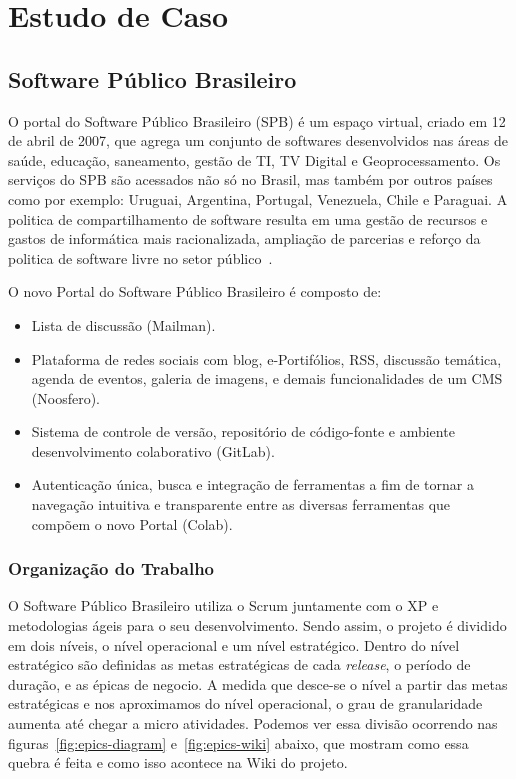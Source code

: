 \chapter{Estudo de Caso}
\label{est}
\section{Software Público Brasileiro}
\label{est:sof}

O portal do Software Público Brasileiro (SPB) é um espaço virtual, criado em 12 de 
abril de 2007, que agrega um conjunto de softwares desenvolvidos nas áreas de saúde, 
educação, saneamento, gestão de TI, TV Digital e Geoprocessamento. Os serviços do
SPB são acessados não só no Brasil, mas também por outros países como por exemplo:
Uruguai, Argentina, Portugal, Venezuela, Chile e Paraguai. A politica de compartilhamento
de software resulta em uma gestão de recursos e gastos de informática mais racionalizada,
ampliação de parcerias e reforço da politica de software livre no setor público~\cite{spb}.

O novo Portal do Software Público Brasileiro é composto de:

\begin{itemize}
    \item Lista de discussão (Mailman).
    \item Plataforma de redes sociais com blog, e-Portifólios, RSS, discussão 
    temática, agenda de eventos, galeria de imagens, e demais funcionalidades de um CMS (Noosfero).
    \item Sistema de controle de versão, repositório de código-fonte e ambiente 
    desenvolvimento colaborativo (GitLab).
    \item Autenticação única, busca e integração de ferramentas a fim de tornar 
    a navegação intuitiva e transparente entre as diversas ferramentas que compõem 
    o novo Portal (Colab).
\end{itemize}

\subsection{Organização do Trabalho}
\label{est:sof:org}

O Software Público Brasileiro utiliza o Scrum juntamente com o XP e metodologias
ágeis para o seu desenvolvimento. Sendo assim, o projeto é dividido em dois níveis,
o nível operacional e um nível estratégico. Dentro do nível estratégico são definidas
as metas estratégicas de cada \textit{release}, o período de duração, e as épicas
de negocio. A medida que desce-se o nível a partir das metas estratégicas e nos
aproximamos do nível operacional, o grau de granularidade aumenta até chegar a
micro atividades. Podemos ver essa divisão ocorrendo nas figuras~\ref{fig:epics-diagram} 
e~\ref{fig:epics-wiki} abaixo, que mostram como essa quebra é feita e como isso acontece 
na Wiki do projeto.

